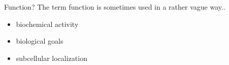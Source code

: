 \documentclass{beamer}
\begin{document}

\begin{frame}{Function?}
The term function is sometimes used in a rather vague way..
\begin{itemize}
\item biochemical activity
\item biological goals
\item subcellular localization
\end{itemize} 

\begin{figure}
\centering
{}
\end{figure}

\end{frame}
\end{document}

